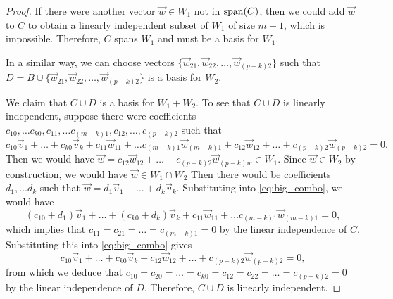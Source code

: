 \documentclass{homework}
\begin{document}
\begin{proof}
		If there were another vector $\vec{w} \in W_1$ not in $\mathrm{span}(C)$, then we could add $\vec{w}$ to $C$ to obtain a linearly independent subset of $W_1$ of size $m + 1$, which is impossible. Therefore, $C$ spans $W_1$ and must be a basis for $W_1$.
		
		In a similar way, we can choose vectors $\{\vec{w}_{21}, \vec{w}_{22}, \dots, \vec{w}_{(p-k)2}\}$ such that $D = B \cup\{\vec{w}_{21}, \vec{w}_{22}, \dots, \vec{w}_{(p-k)2}\}$ is a basis for $W_2$. 
		
		We claim that $C \cup D$ is a basis for $W_1 + W_2$. To see that $C\cup D$ is linearly independent, suppose there were coefficients $c_{10}, \dots c_{k0}, c_{11}, \dots c_{(m-k)1}, c_{12}, \dots, c_{(p-k)2}$ such that
		\begin{equation}
			\label{eq:big_combo}
			c_{10}\vec{v}_1 + \dots + c_{k0}\vec{v}_k + c_{11}\vec{w}_{11} + \dots c_{(m-k)1}\vec{w}_{(m-k)1} + c_{12}\vec{w}_{12} + \dots + c_{(p-k)2}\vec{w}_{(p-k)2} = 0.
		\end{equation}
		Then we would have $\vec{w} = c_{12}\vec{w}_{12} + \dots + c_{(p-k)2}\vec{w}_{(p-k)w} \in W_1$. Since $\vec{w} \in W_2$ by construction, we would have $\vec{w} \in W_1\cap W_2$ Then there would be coefficients $d_1, \dots d_k$ such that $\vec{w} = d_1\vec{v}_1 + \dots + d_k \vec{v}_k$. Substituting into \eqref{eq:big_combo}, we would have
		\begin{equation*}
			(c_{10} + d_1)\vec{v}_1 + \dots + (c_{k0} + d_k)\vec{v}_k + c_{11}\vec{w}_{11} + \dots c_{(m-k)1}\vec{w}_{(m-k)1} = 0,
		\end{equation*}
		which implies that $c_{11} = c_{21} = \dots = c_{(m-k)1} = 0$ by the linear independence of $C$. Substituting this into \eqref{eq:big_combo} gives
		\begin{equation*}
			c_{10}\vec{v}_1 + \dots + c_{k0}\vec{v}_k + c_{12}\vec{w}_{12} + \dots + c_{(p-k)2}\vec{w}_{(p-k)2} = 0,
		\end{equation*}
		from which we deduce that $c_{10} = c_{20} = \dots = c_{k0} = c_{12} = c_{22} = \dots = c_{(p-k)2} = 0$ by the linear independence of $D$. Therefore, $C \cup D$ is linearly independent.
		

\end{proof}
\end{document}
